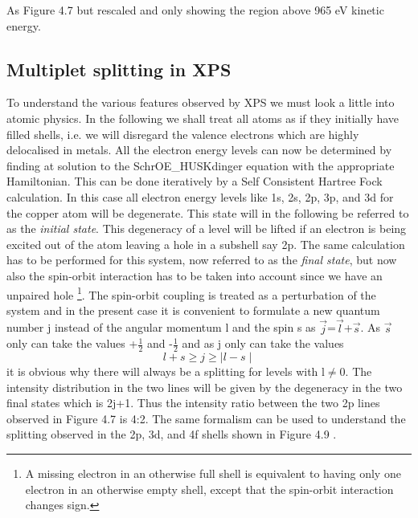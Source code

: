 \vspace*{12cm}

           As Figure 4.7 but rescaled and only
          showing the region above 965 eV kinetic energy.\\





             \subsection{Multiplet splitting in XPS}
          To understand the various features observed by XPS we
          must look a little into atomic physics. In the following we
          shall treat all atoms as if they initially have filled
          shells, i.e. we will disregard the valence electrons which
          are highly delocalised in metals. All the electron energy levels
          can now be determined by finding at solution to the
          SchrOE_HUSKdinger equation with the appropriate Hamiltonian. This
          can be done iteratively by a Self Consistent Hartree Fock
          calculation. In this case all electron energy levels like 1s,
          2s, 2p, 3p, and 3d for the copper atom will be degenerate.
          This state will in the following be referred to as the
          {\em initial state}. This degeneracy of a level will be
          lifted if an electron is being excited out of the atom
          leaving a hole in a subshell say 2p. The same calculation
          has to be performed for this system, now referred to as the
          {\em final state}, but now also the spin-orbit interaction
          has to be taken into account since we have an unpaired hole
          \footnote{A missing electron in an otherwise full shell is
          equivalent to having only one electron in an otherwise empty
          shell, except that the spin-orbit interaction changes sign.}.
          The spin-orbit coupling is treated as a perturbation of the
          system and in the present case it is convenient to formulate
          a new quantum number j instead of the angular momentum l and
          the spin s as $\vec{j}$=$\vec{l}$+$\vec{s}$. As $\vec{s}$
          only can take the values +$\frac{1}{2}$ and -$\frac{1}{2}$
          and as j only can take the values \begin{equation} l+s \geq
          j \geq \mid l-s \mid \end{equation} it is obvious why there
          will always  be a splitting for levels with l$\neq$0. The
          intensity distribution in the two lines will be given by the
          degeneracy in the two final states which is 2j+1.  Thus  the
          intensity ratio between the two 2p lines observed in  Figure
          4.7 is 4:2. The same formalism can be used to understand the
          splitting observed in the 2p, 3d, and  4f  shells  shown  in
          Figure 4.9 \cite{siegbahn1}.\\

